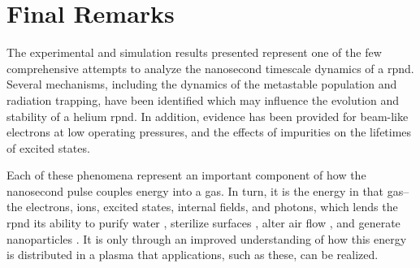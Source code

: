 \section{Final Remarks}

The experimental and simulation results presented represent one of the few
comprehensive attempts to analyze the nanosecond timescale dynamics of a
\acs{rpnd}. Several mechanisms, including the dynamics of the metastable
population and radiation trapping, have been identified which may influence the
evolution and stability of a helium \acs{rpnd}. In addition, evidence has been
provided for beam-like electrons at low operating pressures, and the effects of
impurities on the lifetimes of excited states.

Each of these phenomena represent an important component of how the nanosecond
pulse couples energy into a gas. In turn, it is the energy in that gas--the
electrons, ions, excited states, internal fields, and photons, which lends the
\acs{rpnd} its ability to purify water \cite{Malik2001}, sterilize surfaces
\cite{Ayan2009}, alter air flow \cite{Nishihara2007}, and generate nanoparticles
\cite{Ostrikov2011}. It is only through an improved understanding of how this
energy is distributed in a plasma that applications, such as these, can be
realized.
